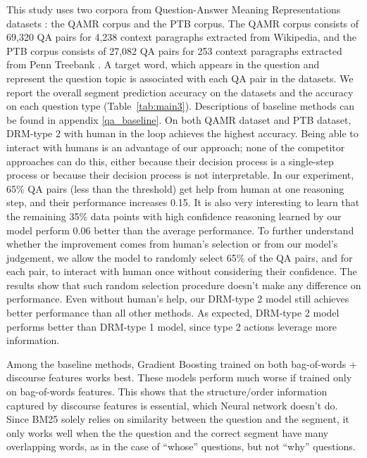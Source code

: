 This study uses two corpora from Question-Answer Meaning Representations datasets \cite{DBLP:conf/naacl/MichaelSHDZ18}: the QAMR corpus and the PTB corpus. The QAMR corpus consists of 69,320 QA pairs for 4,238 context paragraphs extracted from Wikipedia, and the PTB corpus consists of 27,082 QA pairs for 253 context paragraphs extracted from Penn Treebank \cite{DBLP:journals/coling/MarcusSM94}. A target word, which appears in the question and represent the question topic is associated with each QA pair in the datasets. We report the overall segment prediction accuracy on the datasets and the accuracy on each question type (Table~\ref{tab:main3}). Descriptions of baseline methods can be found in appendix \ref{qa_baseline}. On both QAMR dataset and PTB dataset, DRM-type 2 with human in the loop achieves the highest accuracy. Being able to interact with humans is an advantage of our approach; 
none of the competitor approaches can do this, either because their decision process is a single-step process or because their decision process is not interpretable. In our experiment, 65\% QA pairs (less than the threshold) get help from human at one reasoning step, and their performance increases 0.15. It is also very interesting to learn that the remaining 35\% data points with high confidence reasoning learned by our model perform 0.06 better than the average performance. To further understand whether the improvement comes from human's selection or from our model's judgement, we allow the model to randomly select 65\% of the QA pairs, and for each pair, to interact with human once without considering their confidence. The results show that such random selection procedure doesn't make any difference on performance. Even without human's help, our DRM-type 2 model still achieves better performance than all other methods. As expected, DRM-type 2 model performs better than DRM-type 1 model, since type 2 actions leverage more information. 

Among the baseline methods, Gradient Boosting trained on both bag-of-words + discourse features works best. These models perform much worse if trained only on bag-of-words features. This shows that the structure/order information captured by discourse features is essential, which Neural network doesn't do. 
Since BM25 solely relies on similarity between the question and the segment, it only works well when the the question and the correct segment have many overlapping words, as in the case of ``whose'' questions, but not ``why'' questions.


